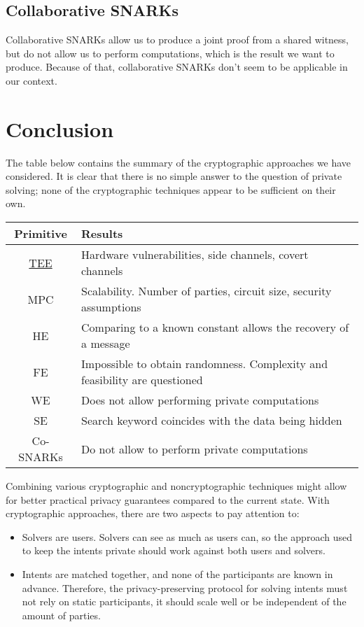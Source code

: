 \documentclass[
    9pt,            %
    report,        %
    affiltop,       %
]{art}
\begin{document}
\subsection{Collaborative SNARKs}

Collaborative SNARKs allow us to produce a joint proof from a shared witness, but do not allow us to perform computations, which is the result we want to produce. Because of that, collaborative SNARKs don't seem to be applicable in our context.

\section{Conclusion}

The table below contains the summary of the cryptographic approaches we have considered. It is clear that there is no simple answer to the question of private solving; none of the cryptographic techniques appear to be sufficient on their own.

\begin{center}
\begin{tabular}{ cl } 
\toprule
 Primitive & Results \\
\midrule
\hyperlink{TEE}{TEE} & Hardware vulnerabilities, side channels, covert channels \\ 
\midrule
MPC & Scalability. Number of parties, circuit size, security assumptions \\ 
\midrule
HE & Comparing to a known constant allows the recovery of a message\\ 
\midrule
FE & Impossible to obtain randomness. Complexity and feasibility are questioned \\ 
\midrule
WE & Does not allow performing private computations \\ 
\midrule
SE & Search keyword coincides with the data being hidden\\ 
\midrule
Co-SNARKs & Do not allow to perform private computations \\ 
\bottomrule
\end{tabular}
\end{center}

Combining various cryptographic and noncryptographic techniques might allow for better practical privacy guarantees compared to the current state. With cryptographic approaches, there are two aspects to pay attention to:

\begin{itemize}
    \item Solvers are users. Solvers can see as much as users can, so the approach used to keep the intents private should work against both users and solvers.
    \item Intents are matched together, and none of the participants are known in advance. Therefore, the privacy-preserving protocol for solving intents must not rely on static participants, it should scale well or be independent of the amount of parties.
\end{itemize}
\end{document}

